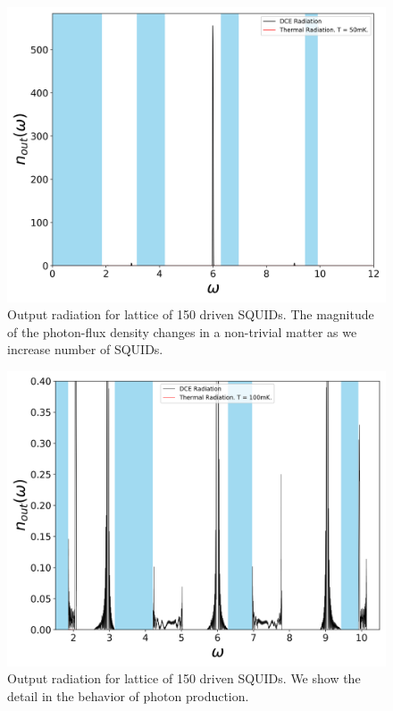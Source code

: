 \begin{figure}[h]
    \includegraphics[width=\textwidth, keepaspectratio]{figures/results/150_SQUIDs_active.png}
    \caption{Output radiation for lattice of 150 driven SQUIDs. The magnitude of the photon-flux density changes in a non-trivial matter as we increase number of SQUIDs.}
    \label{fig:150_SQUIDs_active}
\end{figure}
\clearpage
%
%
\begin{figure}[h]
    \includegraphics[width=\textwidth, keepaspectratio]{figures/results/150_SQUIDs_active_100mK_zoom.png}
    \caption{Output radiation for lattice of 150 driven SQUIDs. We show the detail in the behavior of photon production.}
    \label{fig:150_SQUIDs_active_zoomed}
\end{figure}
\clearpage
%

